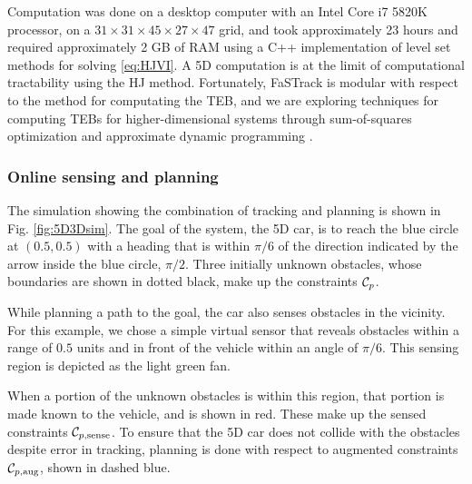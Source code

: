 Computation was done on a desktop computer with an Intel Core i7 5820K processor, on a $31\times31\times45\times27\times47$ grid, and took approximately 23 hours and required approximately 2 GB of RAM using a C++ implementation of level set methods for solving \eqref{eq:HJVI}. 
A 5D computation is at the limit of computational tractability using the HJ method.
Fortunately, FaSTrack is modular with respect to the method for computating the TEB, and we are exploring techniques for computing TEBs for higher-dimensional systems through sum-of-squares optimization \cite{SinghChenEtAl2018} and approximate dynamic programming \cite{royo2018classification}.




\subsubsection{Online sensing and planning}
The simulation showing the combination of tracking and planning is shown in Fig. \ref{fig:5D3Dsim}.
The goal of the system, the 5D car, is to reach the blue circle at $(0.5, 0.5)$ with a heading that is within $\pi/6$ of the direction indicated by the arrow inside the blue circle, $\pi/2$.
Three initially unknown obstacles, whose boundaries are shown in dotted black, make up the constraints $\mathcal C_p$.

While planning a path to the goal, the car also senses obstacles in the vicinity.
For this example, we chose a simple virtual sensor that reveals obstacles within a range of $0.5$ units and in front of the vehicle within an angle of $\pi/6$.
This sensing region is depicted as the light green fan.

When a portion of the unknown obstacles is within this region, that portion is made known to the vehicle, and is shown in red.
These make up the sensed constraints $\mathcal C_{p,\text{sense}}$.
To ensure that the 5D car does not collide with the obstacles despite error in tracking, planning is done with respect to augmented constraints $\mathcal C_{p,\text{aug}}$, shown in dashed blue.

